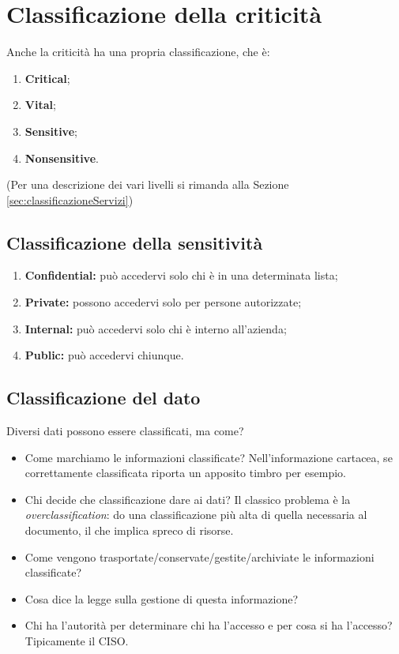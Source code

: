 \section{Classificazione della criticità}

Anche la criticità ha una propria classificazione, che è:
\begin{enumerate}
  \item \textbf{Critical};
  \item \textbf{Vital};
  \item \textbf{Sensitive};
  \item \textbf{Nonsensitive}.
\end{enumerate}
(Per una descrizione dei vari livelli si rimanda alla Sezione~
\ref{sec:classificazioneServizi})

\subsection{Classificazione della sensitività}

\begin{enumerate}
\item \textbf{Confidential:} può accedervi solo chi è in una determinata lista;
\item \textbf{Private:} possono accedervi solo per persone autorizzate;
\item \textbf{Internal:} può accedervi solo chi è interno all'azienda;
\item \textbf{Public:} può accedervi chiunque.
\end{enumerate}


\subsection{Classificazione del dato}

Diversi dati possono essere classificati, ma come?

\begin{itemize}
\item Come marchiamo le informazioni classificate? Nell'informazione cartacea,
se correttamente classificata riporta un apposito timbro per esempio.
\item Chi decide che classificazione dare ai dati? Il classico problema è la
\textit{overclassification}: do una classificazione più alta di quella
necessaria al documento, il che implica spreco di risorse.
\item Come vengono trasportate/conservate/gestite/archiviate le informazioni
classificate?
\item Cosa dice la legge sulla gestione di questa informazione?
\item Chi ha l'autorità per determinare chi ha l'accesso e per cosa si ha
l'accesso? Tipicamente il CISO.
\end{itemize}

